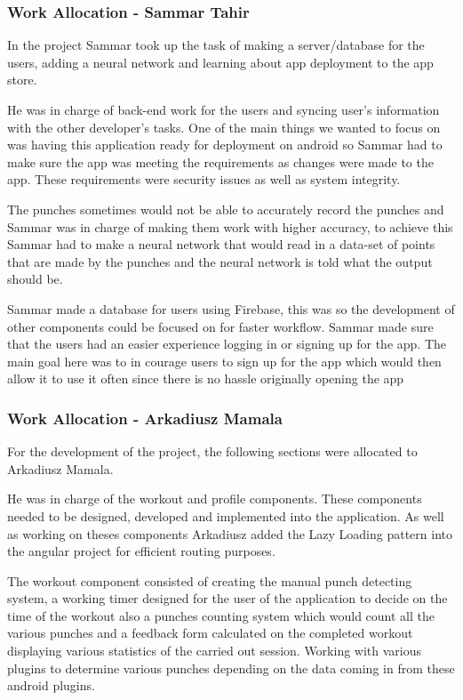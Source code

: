 \documentclass[a4paper,12pt]{report}
\begin{document}
\subsubsection{Work Allocation - Sammar Tahir}
In the project Sammar took up the task of making a server/database for the users, adding a neural network and learning about app deployment to the app store.

He was in charge of back-end work for the users and syncing user's information with the other developer's tasks. One of the main things we wanted to focus on was having this application ready for deployment on android so Sammar had to make sure the app was meeting the requirements as changes were made to the app. These requirements were security issues as well as system integrity.

The punches sometimes would not be able to accurately record the punches and Sammar was in charge of making them work with higher accuracy, to achieve this Sammar had to make a neural network that would read in a data-set of points that are made by the punches and the neural network is told what the output should be.

Sammar made a database for users using Firebase, this was so the development of other components could be focused on for faster workflow. Sammar made sure that the users had an easier experience logging in or signing up for the app. The main goal here was to in courage users to sign up for the app which would then allow it to use it often since there is no hassle originally opening the app

\subsubsection{Work Allocation - Arkadiusz Mamala}
For the development of the project, the following sections were allocated to Arkadiusz Mamala.

He was in charge of the workout and profile components. These components needed to be designed, developed and implemented into the application.
As well as working on theses components Arkadiusz added the Lazy Loading pattern into the angular project for efficient routing purposes.

The workout component consisted of creating the manual punch detecting system, a working timer designed for the user of the application to decide on the time of the workout also a punches counting system which would count all the various punches and a feedback form calculated on the completed workout displaying various statistics of the carried out session.
Working with various plugins to determine various punches depending on the data coming in from these android plugins.
\end{document}
